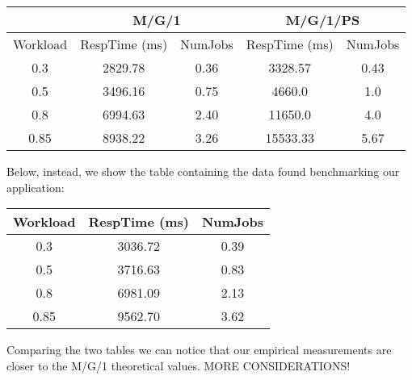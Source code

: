\documentclass[11pt]{scrartcl} %
\begin{document}
\begin{table}[H]
\centering
\begin{tabular}{c|c|c|cc}
\multicolumn{1}{l|}{}         & \multicolumn{2}{c|}{M/G/1}                                                        & \multicolumn{2}{c}{M/G/1/PS}                                                     \\ \hline
\multicolumn{1}{l|}{Workload} & \multicolumn{1}{l|}{RespTime (ms)} & \multicolumn{1}{l|}{NumJobs} & \multicolumn{1}{l|}{RespTime (ms)} & \multicolumn{1}{l}{NumJobs} \\ \hline
0.3                           & 2829.78                            & 0.36                                         & \multicolumn{1}{c|}{3328.57}       & 0.43                                        \\
0.5                           & 3496.16                            & 0.75                                         & \multicolumn{1}{c|}{4660.0}        & 1.0                                         \\
0.8                           & 6994.63                            & 2.40                                         & \multicolumn{1}{c|}{11650.0}       & 4.0                                         \\
0.85                          & 8938.22                            & 3.26                                         & \multicolumn{1}{c|}{15533.33}      & 5.67                                       
\end{tabular}
\end{table}

Below, instead, we show the table containing the data found benchmarking our application:

\begin{table}[H]
\centering
\begin{tabular}{c|c|c|}
\multicolumn{1}{l|}{Workload} & \multicolumn{1}{l|}{RespTime (ms)} & \multicolumn{1}{l|}{NumJobs} \\ \hline
0.3                           & 3036.72                            & 0.39                         \\
0.5                           & 3716.63                            & 0.83                         \\
0.8                           & 6981.09                            & 2.13                         \\
0.85                          & 9562.70                            & 3.62                        
\end{tabular}
\end{table}

Comparing the two tables we can notice that our empirical measurements are closer to the M/G/1 theoretical values. MORE CONSIDERATIONS!
\end{document}
